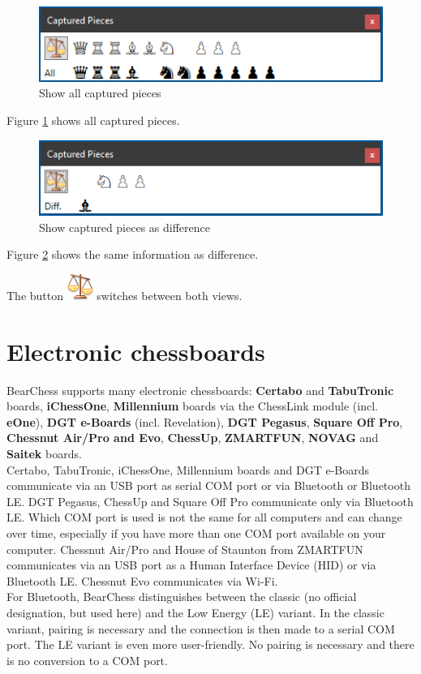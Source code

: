\documentclass[11pt,a4paper]{article}
\begin{document}
	\begin{figure}[H]
		\centering
		\includegraphics[scale=1.0]{CapturedPieces3.png}
		\caption{Show all captured pieces }
		\label{fig:CapturedPieces3}
	\end{figure}
	
	Figure \ref{fig:CapturedPieces3} shows all captured pieces.
	
	\begin{figure}[H]
		\centering
		\includegraphics[scale=1.0]{CapturedPieces4.png}
		\caption{Show captured pieces as difference}
		\label{fig:CapturedPieces4}
	\end{figure}
	Figure \ref{fig:CapturedPieces4} shows the same information as difference.
	
	The button \includegraphics[scale=0.5]{balance_unbalance.png} switches between both views.
	
	
	\section{Electronic chessboards} \label{ElectronicChessBoard}
	BearChess supports many electronic chessboards: \textbf{Certabo} and \textbf{TabuTronic}  boards, \textbf{iChessOne}, \textbf{Millennium} boards via the ChessLink module (incl. \textbf{eOne}), \textbf{DGT e-Boards} (incl. Revelation), \textbf{DGT Pegasus}, \textbf{Square Off Pro}, \textbf{Chessnut Air/Pro and Evo}, \textbf{ChessUp}, \textbf{ZMARTFUN}, \textbf{NOVAG} and \textbf{Saitek} boards.
	\\Certabo, TabuTronic, iChessOne, Millennium boards and DGT e-Boards communicate via an USB port as serial COM port or via Bluetooth or Bluetooth LE. DGT Pegasus, ChessUp and Square Off Pro communicate only via Bluetooth LE. Which COM port is used is not the same for all computers and can change over time, especially if you have more than one COM port available on your computer. Chessnut Air/Pro and House of Staunton from ZMARTFUN communicates via an USB port as a Human Interface Device (HID) or via Bluetooth LE. Chessnut Evo
	communicates via Wi-Fi.\\ 
	For Bluetooth, BearChess distinguishes between the classic (no official designation, but used here) and the Low Energy (LE) variant.
	In the classic variant, pairing is necessary and the connection is then made to a serial COM port. The LE variant is even more user-friendly. No pairing is necessary and there is no conversion to a COM port.
\end{document}
